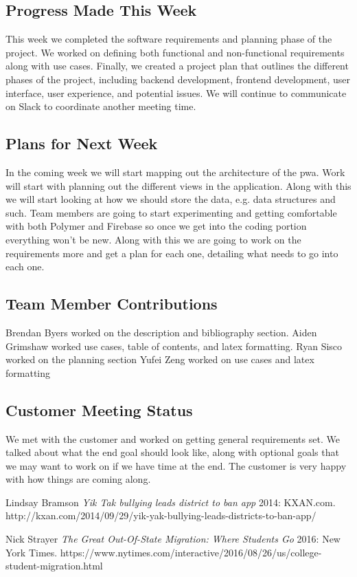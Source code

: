 \documentclass[12pt]{article}
\begin{document}
\subsection{Progress Made This Week}
	This week we completed the software requirements and planning phase of the project.  We worked on defining both functional and non-functional requirements along with use cases.  Finally, we created a project plan that outlines the different phases of the project, including backend development, frontend development, user interface, user experience, and potential issues.  We will continue to communicate on Slack to coordinate another meeting time.
\subsection{Plans for Next Week}
	In the coming week we will start mapping out the architecture of the pwa.  Work will start with planning out the different views in the application.  Along with this we will start looking at how we should store the data, e.g. data structures and such.  Team members are going to start experimenting and getting comfortable with both Polymer and Firebase so once we get into the coding portion everything won’t be new.  Along with this we are going to work on the requirements more and get a plan for each one, detailing what needs to go into each one.
\subsection{Team Member Contributions}
	Brendan Byers worked on the description and bibliography section.
	Aiden Grimshaw worked use cases, table of contents, and latex formatting.
	Ryan Sisco worked on the planning section
	Yufei Zeng worked on use cases and latex formatting

\subsection{Customer Meeting Status}
	We met with the customer and worked on getting general requirements set.  We talked about what the end goal should look like, along with optional goals that we may want to work on if we have time at the end.  The customer is very happy with how things are coming along.

\newpage
  
  

  \begin{thebibliography}{1}

   Lindsay Bramson {\em Yik Tak bullying leads district to ban app}  2014: KXAN.com. http://kxan.com/2014/09/29/yik-yak-bullying-leads-districts-to-ban-app/

    Nick Strayer {\em The Great Out-Of-State Migration: Where Students Go} 2016:
  New York Times. https://www.nytimes.com/interactive/2016/08/26/us/college-student-migration.html

  \end{thebibliography}
\end{document}
